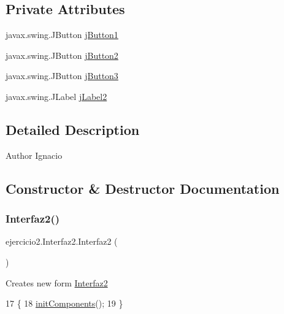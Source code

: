 \subsection*{Private Attributes}
\begin{DoxyCompactItemize}
\item 
javax.\+swing.\+J\+Button \mbox{\hyperlink{classejercicio2_1_1_interfaz2_a949e47628600917db7a23e8578a15ac6}{j\+Button1}}
\item 
javax.\+swing.\+J\+Button \mbox{\hyperlink{classejercicio2_1_1_interfaz2_a93c88ef914c8fc9608562eeb7332ba29}{j\+Button2}}
\item 
javax.\+swing.\+J\+Button \mbox{\hyperlink{classejercicio2_1_1_interfaz2_a777b07babdd7af4ba93aeb3046529a34}{j\+Button3}}
\item 
javax.\+swing.\+J\+Label \mbox{\hyperlink{classejercicio2_1_1_interfaz2_afed2016c320d66b58d4790add9b28196}{j\+Label2}}
\end{DoxyCompactItemize}


\subsection{Detailed Description}
\begin{DoxyAuthor}{Author}
Ignacio 
\end{DoxyAuthor}


\subsection{Constructor \& Destructor Documentation}
\mbox{\label{classejercicio2_1_1_interfaz2_a81dcd7ee80d8193ffc7e1775f4a598d7}} 
\subsubsection{\texorpdfstring{Interfaz2()}{Interfaz2()}}
{\footnotesize\ttfamily ejercicio2.\+Interfaz2.\+Interfaz2 (\begin{DoxyParamCaption}{ }\end{DoxyParamCaption})\hspace{0.3cm}{\ttfamily [inline]}}

Creates new form \mbox{\hyperlink{classejercicio2_1_1_interfaz2}{Interfaz2}} 
\begin{DoxyCode}
17                        \{
18         \mbox{\hyperlink{classejercicio2_1_1_interfaz2_a24831c788d3bdb97c54d540dbaebe99d}{initComponents}}();
19     \}
\end{DoxyCode}


